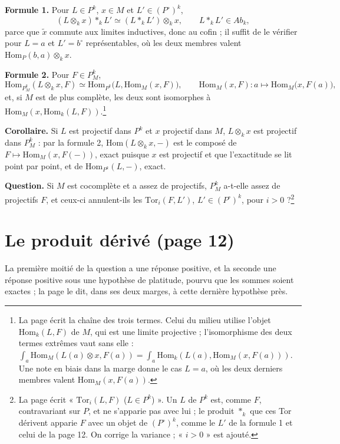 \documentclass[11pt,a4paper]{article}
\begin{document}
\textbf{Formule 1.} Pour $L \in P^{k}$, $x \in M$ et $L' \in (P^{\circ})^{k}$,
\[
(L \otimes_{k} x) *_{k} L' \simeq (L *_{k} L') \otimes_{k} x,
\qquad L *_{k} L' \in Ab_{k},
\]
parce que $\widetilde{x}$ commute aux limites inductives, donc au cofin ; il suffit
de le vérifier pour $L = a$ et $L' = b^{\circ}$ représentables, où les deux
membres valent $\mathrm{Hom}_{P}(b, a) \otimes_{k} x$.

\textbf{Formule 2.} Pour $F \in P^{k}_{M}$,
\[
\mathrm{Hom}_{P^{k}_{M}}(L \otimes_{k} x, F) \simeq
\mathrm{Hom}_{P^{k}}\bigl(L, \mathrm{Hom}_{M}(x, F)\bigr),
\qquad
\mathrm{Hom}_{M}(x, F) : a \longmapsto \mathrm{Hom}_{M}\bigl(x, F(a)\bigr),
\]
et, si $M$ est de plus complète, les deux sont isomorphes à
$\mathrm{Hom}_{M}(x, \mathrm{Hom}_{k}(L, F))$.\footnote{La page écrit la chaîne
des trois termes. Celui du milieu utilise l'objet $\mathrm{Hom}_{k}(L, F)$ de $M$,
qui est une limite projective ; l'isomorphisme des deux termes extrêmes vaut
sans elle :
$\int_{a} \mathrm{Hom}_{M}(L(a) \otimes x, F(a)) = \int_{a}
\mathrm{Hom}_{k}(L(a), \mathrm{Hom}_{M}(x, F(a)))$. Une note en biais dans la
marge donne le cas $L = a$, où les deux derniers membres valent
$\mathrm{Hom}_{M}(x, F(a))$.}

\textbf{Corollaire.} Si $L$ est projectif dans $P^{k}$ et $x$ projectif dans $M$,
$L \otimes_{k} x$ est projectif dans $P^{k}_{M}$ : par la formule 2,
$\mathrm{Hom}(L \otimes_{k} x, -)$ est le composé de $F \mapsto
\mathrm{Hom}_{M}(x, F(-))$, exact puisque $x$ est projectif et que l'exactitude
se lit point par point, et de $\mathrm{Hom}_{P^{k}}(L, -)$, exact.

\textbf{Question.} Si $M$ est cocomplète et a assez de projectifs, $P^{k}_{M}$
a-t-elle assez de projectifs $F$, et ceux-ci annulent-ils les
$\mathrm{Tor}_{i}(F, L')$, $L' \in (P^{\circ})^{k}$, pour $i > 0$ ?\footnote{La
page écrit « $\mathrm{Tor}_{i}(L, F)$ ($L \in P^{k}$) ». Un $L$ de $P^{k}$ est,
comme $F$, contravariant sur $P$, et ne s'apparie pas avec lui ; le produit
$*_{k}$ que ces Tor dérivent apparie $F$ avec un objet de $(P^{\circ})^{k}$,
comme le $L'$ de la formule 1 et celui de la page 12. On corrige la
variance ; « $i > 0$ » est ajouté.}

\section*{Le produit dérivé (page 12)}

La première moitié de la question a une réponse positive, et la seconde une
réponse positive sous une hypothèse de platitude, pourvu que les sommes soient
exactes ; la page le dit, dans ses deux marges, à cette dernière hypothèse
près.
\end{document}
